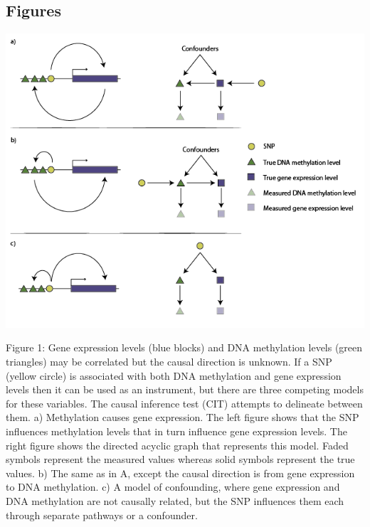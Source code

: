 \documentclass[]{article}
\begin{document}
\newpage

\subsection{Figures}\label{figures}

\includegraphics{../images/dag-01.png}

Figure 1: Gene expression levels (blue blocks) and DNA methylation
levels (green triangles) may be correlated but the causal direction is
unknown. If a SNP (yellow circle) is associated with both DNA
methylation and gene expression levels then it can be used as an
instrument, but there are three competing models for these variables.
The causal inference test (CIT) attempts to delineate between them. a)
Methylation causes gene expression. The left figure shows that the SNP
influences methylation levels that in turn influence gene expression
levels. The right figure shows the directed acyclic graph that
represents this model. Faded symbols represent the measured values
whereas solid symbols represent the true values. b) The same as in A,
except the causal direction is from gene expression to DNA methylation.
c) A model of confounding, where gene expression and DNA methylation are
not causally related, but the SNP influences them each through separate
pathways or a confounder.

\newpage
\end{document}
